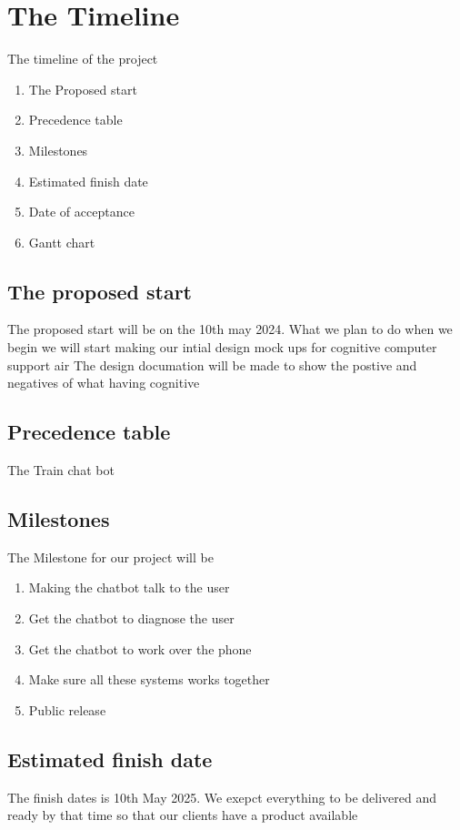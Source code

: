 \documentclass{article}
\begin{document}
\section{The Timeline}
The timeline of the project
\begin{enumerate}
	\item The Proposed start
	\item Precedence table
	\item Milestones
	\item Estimated finish date
	\item Date of acceptance 
	\item Gantt chart
\end{enumerate}

\subsection{The proposed start}
The proposed start will be on the 10th may 2024. What we plan to do when we begin we will start making our intial design mock ups for cognitive computer support air
The design documation will be made to show the postive and negatives of what having cognitive 

\subsection{Precedence table}
The 
Train chat bot

\subsection{Milestones}
The Milestone for our project will be 
	\begin{enumerate}
		\item Making the chatbot talk to the user
		\item Get the chatbot to diagnose the user
		\item Get the chatbot to work over the phone
		\item Make sure all these systems works together
		\item Public release
	\end{enumerate}

\subsection{Estimated finish date}

The finish dates is 10th May 2025. We exepct everything to be delivered and ready by that time so that our clients have a product available 
\end{document}
